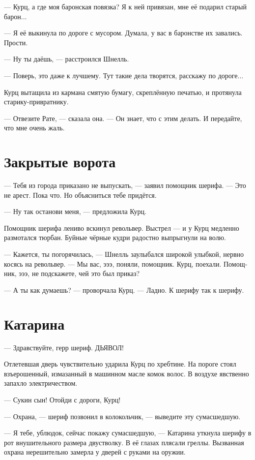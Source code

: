 \documentclass[a4paper,12pt,fleqn]{book}\usepackage{cooltooltips}\usepackage{polyglossia}\setdefaultlanguage[babelshorthands=true]{russian}\setotherlanguage{english}\defaultfontfeatures{Ligatures=TeX,Mapping=tex-text} \usepackage{xcolor}\definecolor{lightgray}{HTML}{bbbbbb}\color{lightgray}\newcommand{\ml}[3]{\textenglish{\textcolor{black}{#3}}}
\begin{document}
--- Курц, а где моя баронская повязка?
Я к ней привязан, мне её подарил старый барон...

--- Я её выкинула по дороге с мусором.
Думала, у вас в баронстве их завались.
Прости.

--- Ну ты даёшь, --- расстроился Шнелль.

--- Поверь, это даже к лучшему.
Тут такие дела творятся, расскажу по дороге...

Курц вытащила из кармана смятую бумагу, скреплённую печатью, и протянула старику-привратнику.

--- Отвезите Рате, --- сказала она.
--- Он знает, что с этим делать.
И передайте, что мне очень жаль.

\section{Закрытые ворота}

--- Тебя из города приказано не выпускать, --- заявил помощник шерифа.
--- Это не арест.
Пока что.
Но объясниться тебе придётся.

--- Ну так останови меня, --- предложила Курц.

Помощник шерифа лениво вскинул револьвер.
Выстрел --- и у Курц медленно размотался тюрбан.
Буйные чёрные кудри радостно выпрыгнули на волю.

--- Кажется, ты погорячилась, --- Шнелль заулыбался широкой улыбкой, нервно косясь на револьвер.
--- Мы вас, эээ, поняли, помощник.
Курц, поехали.
Помощник, эээ, не подскажете, чей это был приказ?

--- А ты как думаешь? --- проворчала Курц.
--- Ладно.
К шерифу так к шерифу.

\section{Катарина}

--- Здравствуйте, герр шериф.
ДЬЯВОЛ!

Отлетевшая дверь чувствительно ударила Курц по хребтине.
На пороге стоял взъерошенный, измазанный в машинном масле комок волос.
В воздухе явственно запахло электричеством.

--- Сукин сын!
Отойди с дороги, Курц!

--- Охрана, --- шериф позвонил в колокольчик, --- выведите эту сумасшедшую.

--- Я тебе, ублюдок, сейчас покажу сумасшедшую, --- Катарина уткнула шерифу в рот внушительного размера двустволку.
В её глазах плясали греллы.
Вызванная охрана нерешительно замерла у дверей с руками на оружии.
\end{document}
